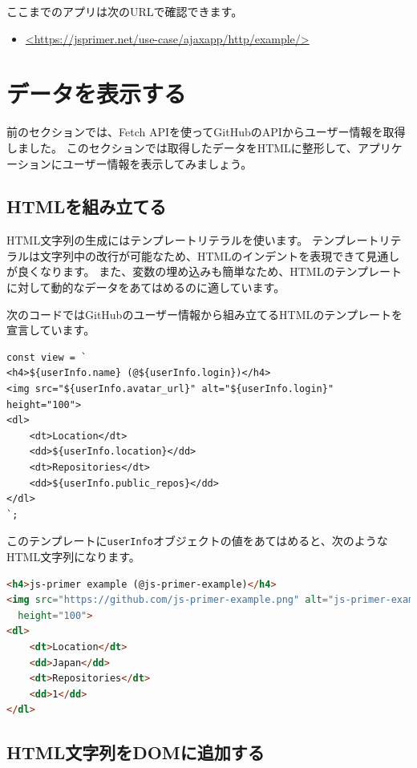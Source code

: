 ここまでのアプリは次のURLで確認できます。
\begin{itemize}
\item
  \url{<https://jsprimer.net/use-case/ajaxapp/http/example/>}
\end{itemize}

\hypertarget{display-data}{%
\section{データを表示する}\label{display-data}}

前のセクションでは、Fetch
APIを使ってGitHubのAPIからユーザー情報を取得しました。
このセクションでは取得したデータをHTMLに整形して、アプリケーションにユーザー情報を表示してみましょう。

\hypertarget{markup-html}{%
\subsection{HTMLを組み立てる}\label{markup-html}}

HTML文字列の生成にはテンプレートリテラルを使います。
テンプレートリテラルは文字列中の改行が可能なため、HTMLのインデントを表現できて見通しが良くなります。
また、変数の埋め込みも簡単なため、HTMLのテンプレートに対して動的なデータをあてはめるのに適しています。

次のコードではGitHubのユーザー情報から組み立てるHTMLのテンプレートを宣言しています。

\begin{lstlisting}
const view = `
<h4>${userInfo.name} (@${userInfo.login})</h4>
<img src="${userInfo.avatar_url}" alt="${userInfo.login}" height="100">
<dl>
    <dt>Location</dt>
    <dd>${userInfo.location}</dd>
    <dt>Repositories</dt>
    <dd>${userInfo.public_repos}</dd>
</dl>
`;
\end{lstlisting}

このテンプレートに\texttt{userInfo}オブジェクトの値をあてはめると、次のようなHTML文字列になります。

\begin{lstlisting}[language=HTML]<h4>js-primer example (@js-primer-example)</h4>
<img src="https://github.com/js-primer-example.png" alt="js-primer-example" 
  height="100">
<dl>
    <dt>Location</dt>
    <dd>Japan</dd>
    <dt>Repositories</dt>
    <dd>1</dd>
</dl>
\end{lstlisting}

\hypertarget{html-to-dom}{%
\subsection{HTML文字列をDOMに追加する}\label{html-to-dom}}

